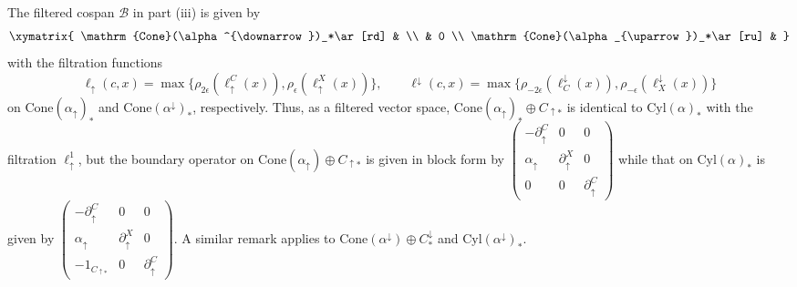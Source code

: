 \documentclass[11pt]{amsart}
\theoremstyle{definition}
\theoremstyle{remark}
\numberwithin{equation}{section}
\def\ep{\epsilon}
\begin{document}
The filtered cospan $\mathcal{B}$ in part (iii) is given by \[  \xymatrix{ \mathrm{Cone}(\alpha^{\downarrow})_*\ar[rd] & \\ & 0 \\ \mathrm{Cone}(\alpha_{\uparrow})_*\ar[ru] &   }  \] with the filtration functions \[ \ell_{\uparrow}(c,x)=\max\{\rho_{2\ep}(\ell_{\uparrow}^{C}(x)),\rho_{\ep}(\ell_{\uparrow}^{X}(x))\}, \qquad  \ell^{\downarrow}(c,x)=\max\{\rho_{-2\ep}(\ell^{\downarrow}_{C}(x)),\rho_{-\ep}(\ell^{\downarrow}_{X}(x))\} \] on $\mathrm{Cone}(\alpha_{\uparrow})_*$ and $\mathrm{Cone}(\alpha^{\downarrow})_*$, respectively.  Thus, as a filtered vector space, $\mathrm{Cone}(\alpha_{\uparrow})_*\oplus C_{\uparrow *}$ is identical to $\mathrm{Cyl}(\alpha)_*$ with the filtration $\ell_{\uparrow}^{1}$, but the boundary operator on $\mathrm{Cone}(\alpha_{\uparrow})\oplus C_{\uparrow *}$ is given in block form by $\left(\begin{array}{ccc}-\partial_{\uparrow}^{C} & 0 & 0 \\ \alpha_{\uparrow} & \partial_{\uparrow}^{X} & 0 \\ 0 & 0 & \partial_{\uparrow}^{C}\end{array}\right)$ while that on 
$\mathrm{Cyl}(\alpha)_*$ is given by 	$\left(\begin{array}{ccc}-\partial_{\uparrow}^{C} & 0 & 0 \\ \alpha_{\uparrow} & \partial_{\uparrow}^{X} & 0 \\ -1_{C_{\uparrow *}} & 0 & \partial_{\uparrow}^{C}\end{array}\right)$.  A similar remark applies to $\mathrm{Cone}(\alpha^{\downarrow})\oplus C^{\downarrow}_{*}$ and $\mathrm{Cyl}(\alpha^{\downarrow})_*$.    
\end{document}
